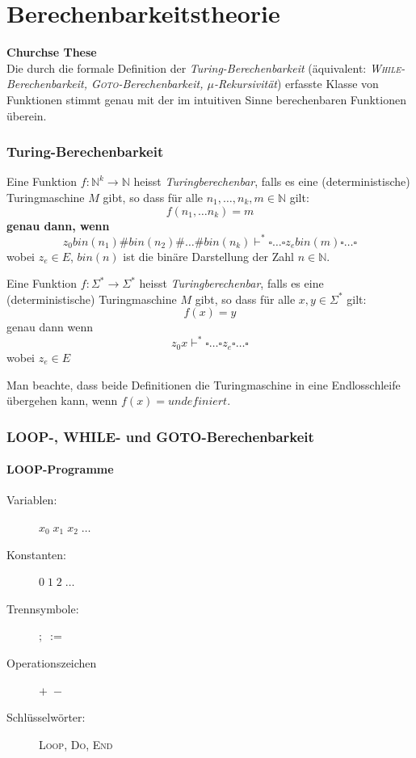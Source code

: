 \documentclass{scrartcl}
\begin{document}
\part*{Berechenbarkeitstheorie}
\begin{shaded}
    \textbf{Churchse These} \\
    Die durch die formale Definition der \emph{Turing-Berechenbarkeit} (äquivalent: \emph{\textsc{While}-Berechenbarkeit, \textsc{Goto}-Berechenbarkeit, $\mu$-Rekursivität}) erfasste Klasse von Funktionen stimmt genau mit der im intuitiven Sinne berechenbaren Funktionen überein.
\end{shaded}

\section*{Turing-Berechenbarkeit}
\begin{shaded}
    Eine Funktion $f:\mathds{N}^k\to \mathds{N}$ heisst \emph{Turingberechenbar}, falls es eine (deterministische) Turingmaschine $M$ gibt, so dass für alle $n_1,\dots,n_k,m\in \mathds{N}$ gilt:
    \[ f(n_1,\dots n_k) = m \] \textbf{genau dann, wenn} \[ z_0 bin(n_1)\#bin(n_2)\#\dots\#bin(n_k)\vdash^* \square\dots\square z_e bin(m)\square\dots\square \] wobei $z_e\in E$, $bin(n)$ ist die binäre Darstellung der Zahl $n\in \mathds{N}$.
\end{shaded}
\begin{shaded}
    Eine Funktion $f:\Sigma^*\to\Sigma^*$ heisst \emph{Turingberechenbar}, falls es eine (deterministische) Turingmaschine $M$ gibt, so dass für alle $x,y\in\Sigma^*$ gilt:
    \[ f(x)=y \] genau dann wenn \[ z_0x\vdash^*\square\dots\square z_e\square\dots\square\] wobei $z_e\in E$
\end{shaded}

Man beachte, dass beide Definitionen die Turingmaschine in eine Endlosschleife übergehen kann, wenn $f(x)=undefiniert$.

\section*{LOOP-, WHILE- und GOTO-Berechenbarkeit}
\subsection*{LOOP-Programme}
\begin{description}
    \item[Variablen:] $x_0\;x_1\;x_2\;\dots$
    \item[Konstanten:] $0\;1\;2\;\dots$
    \item[Trennsymbole:] $;\; :=$
    \item[Operationszeichen] $+\;-$
    \item[Schlüsselwörter:] \textsc{Loop}, \textsc{Do}, \textsc{End}
\end{description}
\end{document}
